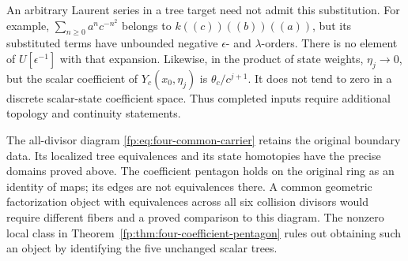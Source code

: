 An arbitrary Laurent series in a tree target need not admit this
substitution.  For example,
\(\sum_{n\ge0}a^nc^{-n^2}\) belongs to
\(k((c))((b))((a))\), but its substituted terms have
unbounded negative \(\epsilon\)- and \(\lambda\)-orders.
There is no element of \(U[\epsilon^{-1}]\) with that expansion.
Likewise, in the product of state weights, \(\eta_j\to0\),
but the scalar coefficient of \(Y_c(x_0,\eta_j)\) is
\(\theta_c/c^{j+1}\).  It does not tend to zero in a discrete
scalar-state coefficient space.  Thus completed inputs require
additional topology and continuity statements.

The all-divisor diagram \eqref{fp:eq:four-common-carrier} retains
the original boundary data.  Its localized tree equivalences and
its state homotopies have the precise domains proved above.
The coefficient pentagon holds on the original ring as an identity
of maps; its edges are not equivalences there.
A common geometric factorization object with equivalences across
all six collision divisors would require different fibers and a
proved comparison to this diagram.  The nonzero local class in
Theorem~\ref{fp:thm:four-coefficient-pentagon} rules out obtaining
such an object by identifying the five unchanged scalar trees.
